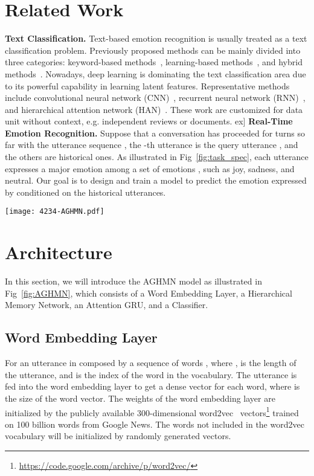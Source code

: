 \documentclass[letterpaper]{article} \usepackage{aaai20}  \usepackage{times}  \usepackage{helvet} \usepackage{courier}  \usepackage[hyphens]{url}  \usepackage{graphicx} \urlstyle{rm} \def\UrlFont{\rm}  \usepackage{graphicx}  \frenchspacing  \setlength{\pdfpagewidth}{8.5in}  \setlength{\pdfpageheight}{11in}
\begin{document}
\section{Related Work}

\noindent\textbf{Text Classification.}
Text-based emotion recognition is usually treated as a text classification problem. Previously proposed methods can be mainly divided into three categories: keyword-based methods~\cite{DBLP:conf/aaai/WilsonWH04}, learning-based methods~\cite{DBLP:conf/webi/YangLC07}, and hybrid methods~\cite{DBLP:journals/talip/WuCL06}. 
Nowadays, deep learning is dominating the text classification area due to its powerful capability in learning latent features. Representative methods include convolutional neural network (CNN)~\cite{DBLP:conf/emnlp/Kim14}, recurrent neural network (RNN)~\cite{DBLP:conf/acl/Abdul-MageedU17}, and hierarchical attention network (HAN)~\cite{DBLP:conf/emnlp/TangQL15}. These work are customized for data unit without context, e.g. independent reviews or documents.
\1ex]
\noindent\textbf{Real-Time Emotion Recognition.}
Suppose that a conversation has proceeded for  turns so far with the utterance sequence , the -th utterance is the query utterance , and the others are historical ones. 
As illustrated in Fig~\ref{fig:task_spec}, each utterance expresses a major emotion  among a set of emotions , such as joy, sadness, and neutral. Our goal is to design and train a model  to predict the emotion expressed by  conditioned on the historical utterances.


\begin{figure*}[!t]
    \centering
    \texttt{[image: 4234-AGHMN.pdf]}
    \caption{The architecture of our AGHMN model.}
    \label{fig:AGHMN}
\end{figure*}

\section{Architecture}

In this section, we will introduce the AGHMN model as illustrated in Fig~\ref{fig:AGHMN}, which consists of a Word Embedding Layer, a Hierarchical Memory Network, an Attention GRU, and a Classifier. 

\subsection{Word Embedding Layer}
For an utterance in  composed by a sequence of words , where ,  is the length of the utterance, and  is the index of the word in the vocabulary. The utterance is fed into the word embedding layer to get a dense vector  for each word, where  is the size of the word vector. The weights of the word embedding layer are initialized by the publicly available 300-dimensional word2vec~\cite{DBLP:conf/nips/MikolovSCCD13} vectors\footnote{\url{https://code.google.com/archive/p/word2vec/}} trained on 100 billion words from Google News. The words not included in the word2vec vocabulary will be initialized by randomly generated vectors.
\end{document}
